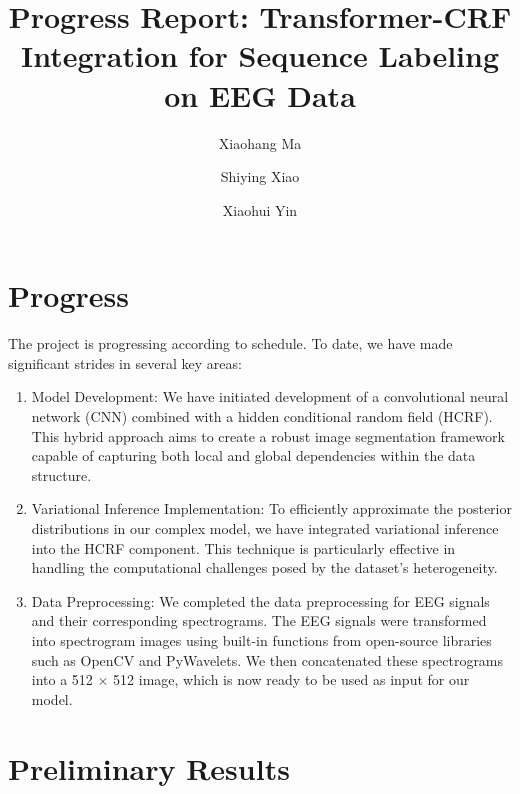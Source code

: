 \documentclass[10pt]{article}
\begin{document}
\title{\vspace{-1cm} \Large
Progress Report: Transformer-CRF Integration for Sequence Labeling on EEG Data}

\author[1]{Xiaohang Ma}
\author[2]{Shiying Xiao}
\author[2]{Xiaohui Yin}


\date{\vspace{-1.3cm}}

\maketitle


\section{Progress}


The project is progressing according to schedule. To date, we have made
significant strides in several key areas:
\begin{enumerate}
\item Model Development:
We have initiated development of a convolutional neural network (CNN) combined
with a hidden conditional random field (HCRF). This hybrid approach aims to
create a robust image segmentation framework capable of capturing both local
and global dependencies within the data structure.
\item Variational Inference Implementation:
To efficiently approximate the posterior distributions in our complex model,
we have integrated variational inference into the HCRF component.
This technique is particularly effective in handling the computational
challenges posed by the dataset's heterogeneity.
\item Data Preprocessing:
We completed the data preprocessing for EEG signals and their corresponding
spectrograms. The EEG signals were transformed into spectrogram images using
built-in functions from open-source libraries such as OpenCV and PyWavelets.
We then concatenated these spectrograms into a 512 $\times$ 512 image,
which is now ready to be used as input for our model.
\end{enumerate}


\section{Preliminary Results}
\end{document}

